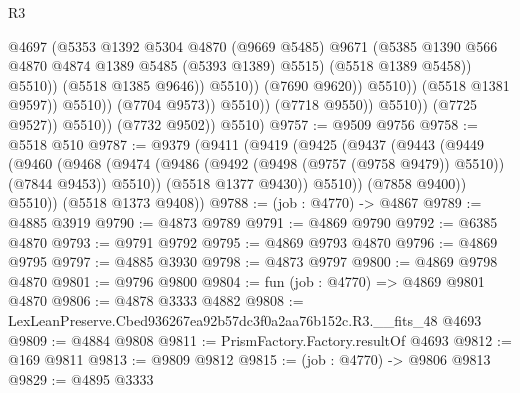 \begin{lexlean}{R3}
\begin{coremodule}
                                                @4697
                                                (@5353
                                                  @1392
                                                  @5304
                                                  @4870
                                                  (@9669 @5485)
                                                  @9671
                                                  (@5385
                                                    @1390
                                                    @566
                                                    @4870
                                                    @4874
                                                    @1389
                                                    @5485
                                                    (@5393 @1389)
                                                    @5515)
                                                  (@5518 @1389 @5458))
                                                @5510))
                                            (@5518 @1385 @9646))
                                          @5510))
                                      (@7690 @9620))
                                    @5510))
                                (@5518 @1381 @9597))
                              @5510))
                          (@7704 @9573))
                        @5510))
                    (@7718 @9550))
                  @5510))
              (@7725 @9527))
            @5510))
        (@7732 @9502))
      @5510)
@9757 := @9509 @9756
@9758 := @5518 @510
@9787 := @9379
    (@9411
      (@9419
        (@9425
          (@9437
            (@9443
              (@9449
                (@9460
                  (@9468
                    (@9474 (@9486 (@9492 (@9498 (@9757 (@9758 @9479)) @5510)) (@7844 @9453)) @5510))
                  (@5518 @1377 @9430))
                @5510))
            (@7858 @9400))
          @5510))
      (@5518 @1373 @9408))
@9788 := (job : @4770) -> @4867
@9789 := @4885 @3919
@9790 := @4873 @9789
@9791 := @4869 @9790
@9792 := @6385 @4870
@9793 := @9791 @9792
@9795 := @4869 @9793 @4870
@9796 := @4869 @9795
@9797 := @4885 @3930
@9798 := @4873 @9797
@9800 := @4869 @9798 @4870
@9801 := @9796 @9800
@9804 := fun (job : @4770) => @4869 @9801 @4870
@9806 := @4878 @3333 @4882
@9808 := LexLeanPreserve.Cbed936267ea92b57dc3f0a2aa76b152c.R3.__fits_48 @4693
@9809 := @4884 @9808
@9811 := PrismFactory.Factory.resultOf @4693
@9812 := @169 @9811
@9813 := @9809 @9812
@9815 := (job : @4770) -> @9806 @9813
@9829 := @4895
    @3333

\end{coremodule}
\end{lexlean}
